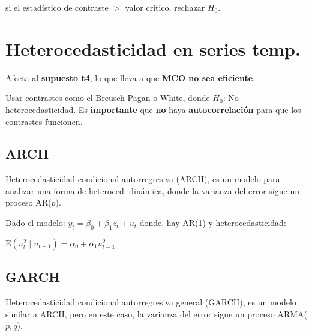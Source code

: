 \documentclass[10pt, a4paper, landscape]{article}
\newcommand{\E}{\mathrm{E}}
\begin{document}
\begin{multicols}{3}
\begin{enumerate}[leftmargin=*]
			si el estadístico de contraste $>$ valor crítico, rechazar $H_0$.
		\end{enumerate}

		\section*{Heterocedasticidad en series temp.}
		
		Afecta al \textbf{supuesto t4}, lo que lleva a que \textbf{MCO no sea eficiente}.
		
		Usar contrastes como el Breusch-Pagan o White, donde $H_{0}$: No heterocedasticidad. Es \textbf{importante} que \textbf{no} haya \textbf{autocorrelación} para que los contrastes funcionen.
		
		\subsection*{ARCH}
		
		Heterocedasticidad condicional autorregresiva (ARCH), es un modelo para analizar una forma de heteroced. dinámica, donde la varianza del error sigue un proceso AR($p$).
		
		Dado el modelo: $y_{t} = \beta_{0} + \beta_{1} z_{t} + u_{t}$ donde, hay AR(1) y heterocedasticidad:
		
		\begin{center}
			$\E(u^{2}_{t} \mid u_{t - 1}) = \alpha_{0} + \alpha_{1} u^{2}_{t - 1}$
		\end{center}
		
		\subsection*{GARCH}
		
		Heterocedasticidad condicional autorregresiva general (GARCH), es un modelo similar a ARCH, pero en este caso, la varianza del error sigue un proceso ARMA($p, q$).
	\end{multicols}
\end{document}
